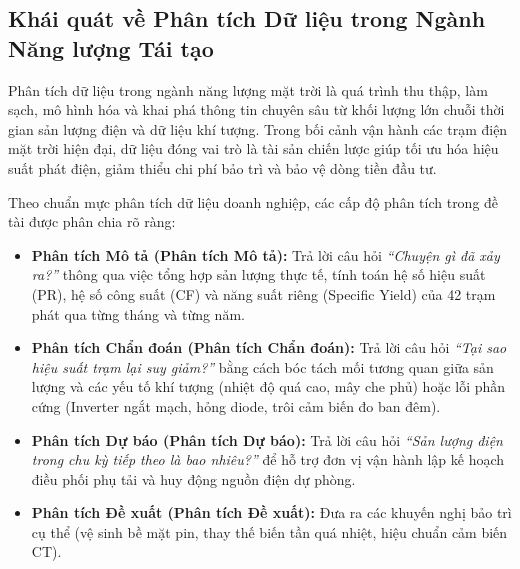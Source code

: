 \documentclass[12pt, a4paper]{report}
\begin{document}
\subsection{Khái quát về Phân tích Dữ liệu trong Ngành Năng lượng Tái tạo}
Phân tích dữ liệu trong ngành năng lượng mặt trời là quá trình thu thập, làm sạch, mô hình hóa và khai phá thông tin chuyên sâu từ khối lượng lớn chuỗi thời gian sản lượng điện và dữ liệu khí tượng. Trong bối cảnh vận hành các trạm điện mặt trời hiện đại, dữ liệu đóng vai trò là tài sản chiến lược giúp tối ưu hóa hiệu suất phát điện, giảm thiểu chi phí bảo trì và bảo vệ dòng tiền đầu tư.

Theo chuẩn mực phân tích dữ liệu doanh nghiệp, các cấp độ phân tích trong đề tài được phân chia rõ ràng:
\begin{itemize}[noitemsep]
    \item \textbf{Phân tích Mô tả (Phân tích Mô tả):} Trả lời câu hỏi \textit{``Chuyện gì đã xảy ra?''} thông qua việc tổng hợp sản lượng thực tế, tính toán hệ số hiệu suất (PR), hệ số công suất (CF) và năng suất riêng (Specific Yield) của 42 trạm phát qua từng tháng và từng năm.
    \item \textbf{Phân tích Chẩn đoán (Phân tích Chẩn đoán):} Trả lời câu hỏi \textit{``Tại sao hiệu suất trạm lại suy giảm?''} bằng cách bóc tách mối tương quan giữa sản lượng và các yếu tố khí tượng (nhiệt độ quá cao, mây che phủ) hoặc lỗi phần cứng (Inverter ngắt mạch, hỏng diode, trôi cảm biến đo ban đêm).
    \item \textbf{Phân tích Dự báo (Phân tích Dự báo):} Trả lời câu hỏi \textit{``Sản lượng điện trong chu kỳ tiếp theo là bao nhiêu?''} để hỗ trợ đơn vị vận hành lập kế hoạch điều phối phụ tải và huy động nguồn điện dự phòng.
    \item \textbf{Phân tích Đề xuất (Phân tích Đề xuất):} Đưa ra các khuyến nghị bảo trì cụ thể (vệ sinh bề mặt pin, thay thế biến tần quá nhiệt, hiệu chuẩn cảm biến CT).
\end{itemize}
\end{document}
